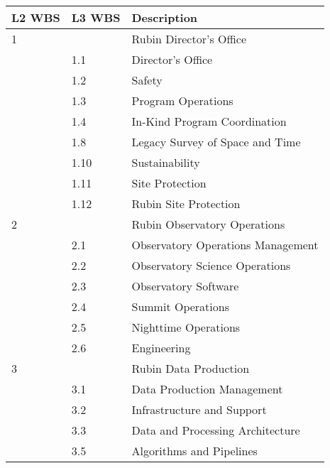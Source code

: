 \begin{longtable}[]{@{}lll@{}}

\hline
L2 \gls{WBS} & L3 \gls{WBS} & Description \tabularnewline
\hline
\endhead

1 & & Rubin Director's Office  \tabularnewline
  & 1.1 & \hspace{0.5cm} Director's Office  \tabularnewline
  & 1.2 & \hspace{0.5cm} Safety  \tabularnewline
  & 1.3 & \hspace{0.5cm} Program Operations\footnotemark[1]  \tabularnewline
  & 1.4 & \hspace{0.5cm} In-Kind Program Coordination  \tabularnewline
  & 1.8 & \hspace{0.5cm} Legacy Survey of Space and Time  \tabularnewline
  & 1.10 & \hspace{0.5cm} Sustainability  \tabularnewline
  & 1.11 & \hspace{0.5cm} Site Protection  \tabularnewline
  & 1.12 & \hspace{0.5cm} Rubin Site Protection  \tabularnewline
2 & & Rubin Observatory Operations  \tabularnewline
  & 2.1 & \hspace{0.5cm} Observatory Operations Management  \tabularnewline
  & 2.2 & \hspace{0.5cm} Observatory Science Operations  \tabularnewline
  & 2.3 & \hspace{0.5cm} Observatory Software  \tabularnewline
  & 2.4 & \hspace{0.5cm} Summit Operations  \tabularnewline
  & 2.5 & \hspace{0.5cm} Nighttime Operations  \tabularnewline
  & 2.6 & \hspace{0.5cm} Engineering  \tabularnewline
3 & & Rubin Data Production \tabularnewline
  & 3.1 & \hspace{0.5cm} Data Production Management  \tabularnewline
  & 3.2 & \hspace{0.5cm} Infrastructure and Support  \tabularnewline
  & 3.3 & \hspace{0.5cm} Data and Processing Architecture  \tabularnewline
  & 3.5 & \hspace{0.5cm} Algorithms and Pipelines  \tabularnewline

\end{longtable}
